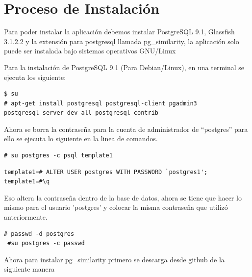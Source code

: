 
\chapter{Proceso de Instalación}

Para poder instalar la aplicación debemos instalar PostgreSQL 9.1, Glassfish 3.1.2.2 y la extensión
para postgresql llamada pg\_similarity, la aplicación solo puede ser instalada bajo sistemas
operativos GNU/Linux


Para la instalación de PostgreSQL 9.1 (Para Debian/Linux), en una terminal se ejecuta los siguiente:\\

\begin{lstlisting}
$ su
# apt-get install postgresql postgresql-client pgadmin3
postgresql-server-dev-all postgresql-contrib
\end{lstlisting}

Ahora se borra la contraseña para la cuenta de  administrador de ``postgres'' para ello se ejecuta lo
siguiente en la linea de comandos. \\

\begin{lstlisting}
# su postgres -c psql template1
\end{lstlisting}

\begin{lstlisting}
template1=# ALTER USER postgres WITH PASSWORD `postgres1';
template1=#\q
\end{lstlisting}

Eso altera la contraseña dentro de la base de datos, ahora se tiene que hacer lo mismo para el  
usuario 'postgres' y colocar la misma contraseña que utilizó anteriormente. \\

\begin{lstlisting}
# passwd -d postgres
 #su postgres -c passwd
\end{lstlisting}

Ahora para instalar pg\_similarity primero se descarga desde github de la siguiente manera

